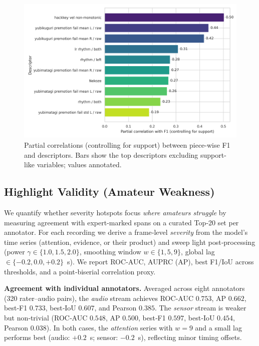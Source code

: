 \documentclass[sigconf,review,anonymous]{acmart}
\begin{document}
\begin{figure}[t]
  \centering
  \includegraphics[width=0.95\linewidth]{figures/piece_f1_correlation_bar.png}
  \caption{Partial correlations (controlling for support) between piece-wise F1 and descriptors. Bars show the top descriptors excluding support-like variables; values annotated.}
  \label{fig:piece_f1_corr_bar}
\end{figure}

\subsection{Highlight Validity (Amateur Weakness)}
We quantify whether severity hotspots focus \emph{where amateurs struggle} by measuring agreement with expert-marked spans on a curated Top‑20 set per annotator. For each recording we derive a frame‑level \emph{severity} from the model's time series (attention, evidence, or their product) and sweep light post‑processing (power $\gamma\in\{1.0,1.5,2.0\}$, smoothing window $w\in\{1,5,9\}$, global lag $\in\{-0.2,0.0,+0.2\}$~s). We report ROC‑AUC, AUPRC (AP), best F1/IoU across thresholds, and a point‑biserial correlation proxy.

\textbf{Agreement with individual annotators.} Averaged across eight annotators (320 rater–audio pairs), the \emph{audio} stream achieves ROC‑AUC $0.753$, AP $0.662$, best‑F1 $0.733$, best‑IoU $0.607$, and Pearson $0.385$. The \emph{sensor} stream is weaker but non‑trivial (ROC‑AUC $0.548$, AP $0.500$, best‑F1 $0.597$, best‑IoU $0.454$, Pearson $0.038$). In both cases, the \emph{attention} series with $w{=}9$ and a small lag performs best (audio: $+0.2$~s; sensor: $-0.2$~s), reflecting minor timing offsets.
\end{document}

